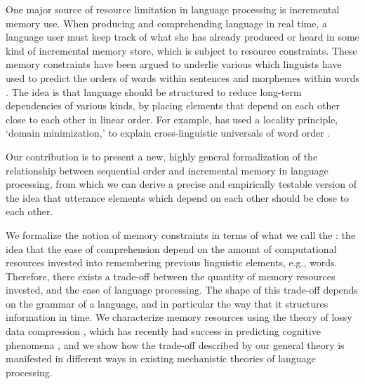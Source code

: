 One major source of resource limitation in language processing is incremental memory use. 
When producing and comprehending language in real time, a language user must keep track of what she has already produced or heard in some kind of incremental memory store, which is subject to resource constraints.
These memory constraints have been argued to underlie various  which linguists have used to predict the orders of words within sentences and morphemes within words  \citep[e.g.][]{behaghel1932deutsche,givon1985iconicity,bybee-morphology-1985,rijkhoff-explaining-1990,hawkins-efficiency-2003,hawkins2014crosslinguistic,temperley-minimizing-2018}.
The idea is that language should be structured to reduce long-term dependencies of various kinds, by placing elements that depend on each other close to each other in linear order.
For example, \citet{hawkins-efficiency-2003,hawkins2014crosslinguistic} has used a locality principle, `domain minimization,' to explain cross-linguistic universals of word order \citep[see also][for reviews of this idea and its predictions]{liu-dependency-2017,temperley-minimizing-2018}.

Our contribution is to present a new, highly general formalization of the relationship between sequential order and incremental memory in language processing, from which we can derive a precise and empirically testable version of the idea that utterance elements which depend on each other should be close to each other. 

We formalize the notion of memory constraints in terms of what we call the : the idea that the ease of comprehension %
depend on the amount of computational resources invested into remembering previous linguistic elements, e.g., words. %
Therefore, there exists a trade-off between the quantity of memory resources invested, and the ease of language processing.
The shape of this trade-off depends on the grammar of a language, and in particular the way that it structures information in time.
We characterize memory resources using the theory of lossy data compression \citep{cover2006elements,berger2003rate}, which has recently had success in predicting cognitive phenomena \citep{sims2018efficient,zenon2019information}, and we show how the trade-off described by our general theory is manifested in different ways in existing mechanistic theories of language processing. 


